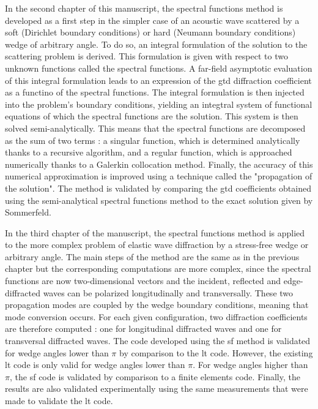 In the second chapter of this manuscript, the spectral functions method is developed as a first step in the simpler case of an acoustic wave scattered by a soft (Dirichlet boundary conditions) or hard (Neumann boundary conditions) wedge of arbitrary angle. To do so, an integral formulation of the solution to the scattering problem is derived. This formulation is given with respect to two unknown functions called the spectral functions. A far-field asymptotic evaluation of this integral formulation leads to an expression of the \acrshort{gtd} diffraction coefficient as a functino of the spectral functions. The integral formulation is then injected into the problem's boundary conditions, yielding an integtral system of functional equations of which the spectral functions are the solution. This system is then solved semi-analytically. This means that the spectral functions are decomposed as the sum of two terms : a singular function, which is determined analytically thanks to a recursive algorithm, and a regular function, which is approached numerically thanks to a Galerkin collocation method. Finally, the accuracy of this numerical approximation is improved using a technique called the "propagation of the solution". The method is validated by comparing the \acrshort{gtd} coefficients obtained using the semi-analytical spectral functions method to the exact solution given by Sommerfeld.

In the third chapter of the manuscript, the spectral functions method is applied to the more complex problem of elastic wave diffraction by a stress-free wedge or arbitrary angle. The main steps of the method are the same as in the previous chapter but the corresponding computations are more complex, since the spectral functions are now two-dimensional vectors and the incident, reflected and edge-diffracted waves can be polarized longitudinally and transversally. These two propagation modes are coupled by the wedge boundary conditions, meaning that mode conversion occurs. For each given configuration, two diffraction coefficients are therefore computed : one for longitudinal diffracted waves and one for transversal diffracted waves. The code developed using the \acrfull{sf} method is validated for wedge angles lower than $\pi$ by comparison to the \acrfull{lt} code. However, the existing \acrshort{lt} code is only valid for wedge angles lower than $\pi$. For wedge angles higher than $\pi$, the \acrshort{sf} code is validated by comparison to a finite elements code. Finally, the results are also validated experimentally using the same measurements that were made to validate the \acrshort{lt} code.

